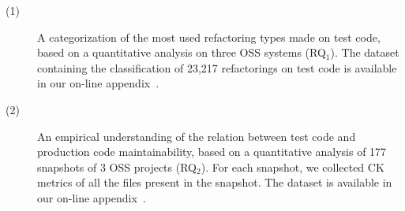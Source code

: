 \begin{description}

\item[(1)] A categorization of the most used refactoring types made on test code, based on a quantitative 
  analysis on three OSS systems (RQ$_1$). The dataset containing the classification of 23,217 refactorings on test code is available in our on-line appendix~\cite{appendix}.
  
\item[(2)] An empirical understanding of the relation between test code and production code maintainability, based on a quantitative analysis of 177 snapshots of 3 OSS projects (RQ$_2$). For each snapshot, we collected CK metrics of all the files present in the snapshot. The dataset is available in our on-line appendix~\cite{appendix}.


\end{description}
